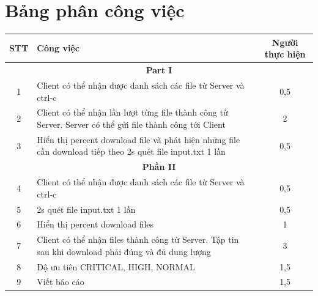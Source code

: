 \documentclass[a4paper,12pt]{report}
\begin{document}
\section{Bảng phân công việc}
\begin{center}
  \renewcommand{\arraystretch}{1.5}
  \begin{tabular}{|c|p{}|c|}
    \hline
    \textbf{STT} & \textbf{Công việc}                                                                                         & \textbf{Người thực hiện} \\\hline
    \multicolumn{3}{|c|}{\textbf{Part I}}                                                                                                                \\\hline
    1            & Client có thể nhận được danh sách các file từ Server và ctrl-c                                             & 0,5                      \\\hline
    2            & Client có thể nhận lần lượt từng file thành công từ Server. Server có thể gửi file thành công tới Client   & 2                        \\\hline
    3            & Hiển thị percent download file và phát hiện những file cần download tiếp theo 2s quét file input.txt 1 lần & 0,5                      \\\hline
    \multicolumn{3}{|c|}{\textbf{Phần II}}                                                                                                               \\\hline
    4            & Client có thể nhận được danh sách các file từ Server và ctrl-c                                             & 0,5                      \\\hline
    5            & 2s quét file input.txt 1 lần                                                                               & 0,5                      \\\hline
    6            & Hiển thị percent download files                                                                            & 1                        \\\hline
    7            & Client có thể nhận files thành công từ Server. Tập tin sau khi download phải đúng và đủ dung lượng         & 3                        \\\hline
    8            & Độ ưu tiên CRITICAL, HIGH, NORMAL                                                                          & 1,5                      \\\hline
    9            & Viết báo cáo                                                                                               & 1,5                      \\\hline
  \end{tabular}
\end{center}
\end{document}
